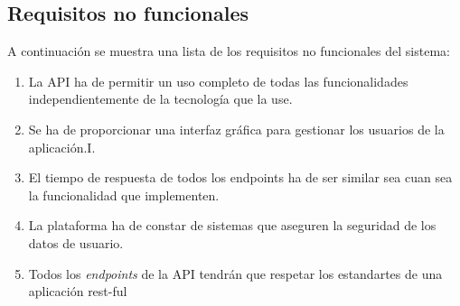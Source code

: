 \subsection {Requisitos no funcionales}
A continuación se muestra una lista de los requisitos no funcionales del sistema:

\begin{enumerate}
\item La API ha de permitir un uso completo de todas las funcionalidades independientemente de la tecnología que la use.
\item Se ha de proporcionar una interfaz gráfica para gestionar los usuarios de la aplicación.I.
\item El tiempo de respuesta de todos los endpoints ha de ser similar sea cuan sea la funcionalidad que implementen.
\item La plataforma ha de constar de sistemas que aseguren la seguridad de los datos de usuario.
\item Todos los \textit{endpoints} de la API tendrán que respetar los estandartes de una aplicación rest-ful
\end{enumerate}
